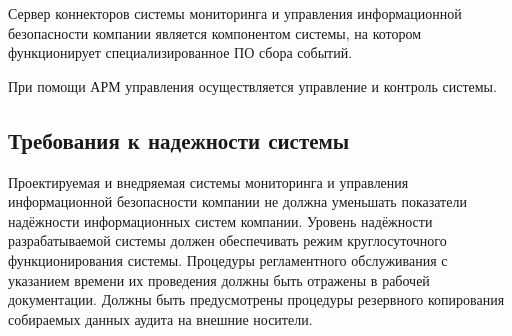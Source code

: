 Сервер коннекторов системы мониторинга и управления информационной безопасности компании является компонентом системы, на котором функционирует специализированное ПО сбора событий.

При помощи АРМ управления осуществляется управление и контроль системы.

\subsection{Требования к надежности системы}
Проектируемая и внедряемая системы мониторинга и управления информационной безопасности компании не должна уменьшать показатели надёжности информационных систем компании. Уровень надёжности разрабатываемой системы должен обеспечивать режим круглосуточного функционирования системы. Процедуры регламентного обслуживания с указанием времени их проведения должны быть отражены в рабочей документации. Должны быть предусмотрены процедуры резервного копирования собираемых данных аудита на внешние носители.

